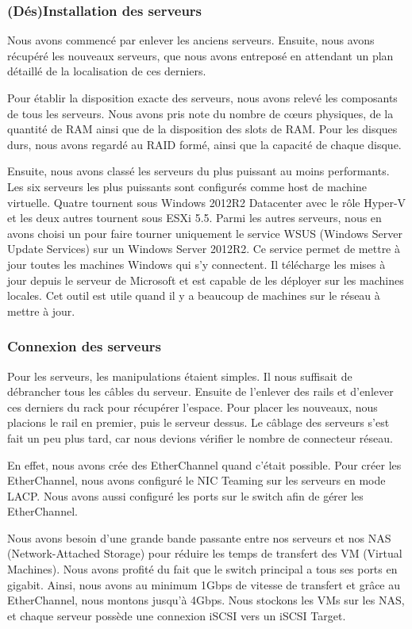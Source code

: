 \subsubsection{(Dés)Installation des serveurs}
Nous avons commencé par enlever les anciens serveurs.
Ensuite, nous avons récupéré les nouveaux serveurs, que nous avons entreposé en attendant un plan détaillé de la localisation de ces derniers.

Pour établir la disposition exacte des serveurs, nous avons relevé les composants de tous les serveurs.
Nous avons pris note du nombre de cœurs physiques, de la quantité de RAM ainsi que de la disposition des slots de RAM.
Pour les disques durs, nous avons regardé au RAID formé, ainsi que la capacité de chaque disque.

Ensuite, nous avons classé les serveurs du plus puissant au moins performants. 
Les six serveurs les plus puissants sont configurés comme host de machine virtuelle. 
Quatre tournent sous Windows 2012R2 Datacenter avec le rôle Hyper-V et les deux autres tournent sous ESXi 5.5.
Parmi les autres serveurs, nous en avons choisi un pour faire tourner uniquement le service WSUS (Windows Server Update Services) sur un Windows Server 2012R2. 
Ce service permet de mettre à jour toutes les machines Windows qui s'y connectent.
Il télécharge les mises à jour depuis le serveur de Microsoft et est capable de les déployer sur les machines locales.
Cet outil est utile quand il y a beaucoup de machines sur le réseau à mettre à jour. 

\subsubsection{Connexion des serveurs}
Pour les serveurs, les manipulations étaient simples. 
Il nous suffisait de débrancher tous les câbles du serveur.
Ensuite de l'enlever des rails et d'enlever ces derniers du rack pour récupérer l'espace.
Pour placer les nouveaux, nous placions le rail en premier, puis le serveur dessus.
Le câblage des serveurs s'est fait un peu plus tard, car nous devions vérifier le nombre de connecteur réseau. 

En effet, nous avons crée des EtherChannel quand c'était possible.
Pour créer les EtherChannel, nous avons configuré le NIC Teaming sur les serveurs en mode LACP.
Nous avons aussi configuré les ports sur le switch afin de gérer les EtherChannel.
 
Nous avons besoin d'une grande bande passante entre nos serveurs et nos NAS (Network-Attached Storage) pour réduire les temps de transfert des VM (Virtual Machines).
Nous avons profité du fait que le switch principal a tous ses ports en gigabit. 
Ainsi, nous avons au minimum 1Gbps de vitesse de transfert et grâce au EtherChannel, nous montons jusqu'à 4Gbps.
Nous stockons les VMs sur les NAS, et chaque serveur possède une connexion iSCSI vers un iSCSI Target. 

